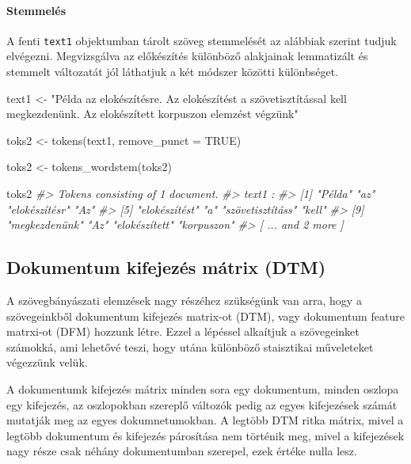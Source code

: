 \documentclass[
]{book}
\newenvironment{Shaded}{\begin{snugshade}}{\end{snugshade}}
\newcommand{\AttributeTok}[1]{\textcolor[rgb]{0.77,0.63,0.00}{#1}}
\newcommand{\CommentTok}[1]{\textcolor[rgb]{0.56,0.35,0.01}{\textit{#1}}}
\newcommand{\ConstantTok}[1]{\textcolor[rgb]{0.00,0.00,0.00}{#1}}
\newcommand{\FunctionTok}[1]{\textcolor[rgb]{0.00,0.00,0.00}{#1}}
\newcommand{\NormalTok}[1]{#1}
\newcommand{\OtherTok}[1]{\textcolor[rgb]{0.56,0.35,0.01}{#1}}
\newcommand{\StringTok}[1]{\textcolor[rgb]{0.31,0.60,0.02}{#1}}
\begin{document}
\hypertarget{stemmeluxe9s}{%
\paragraph{Stemmelés}\label{stemmeluxe9s}}

A fenti \texttt{text1} objektumban tárolt szöveg stemmelését az alábbiak
szerint tudjuk elvégezni. Megvizsgálva az előkészítés különböző
alakjainak lemmatizált és stemmelt változatát jól láthatjuk a két
módszer közötti különbséget.

\begin{Shaded}
\begin{Highlighting}[]

\NormalTok{text1 }\OtherTok{\textless{}{-}} \StringTok{"Példa az elokészítésre. Az elokészítést a szövetisztítással kell megkezdenünk. Az elokészített korpuszon elemzést végzünk"}

\NormalTok{toks2 }\OtherTok{\textless{}{-}} \FunctionTok{tokens}\NormalTok{(text1, }\AttributeTok{remove\_punct =} \ConstantTok{TRUE}\NormalTok{)}

\NormalTok{toks2 }\OtherTok{\textless{}{-}} \FunctionTok{tokens\_wordstem}\NormalTok{(toks2)}

\NormalTok{toks2}
\CommentTok{\#\textgreater{} Tokens consisting of 1 document.}
\CommentTok{\#\textgreater{} text1 :}
\CommentTok{\#\textgreater{}  [1] "Példa"           "az"              "elokészítésr"    "Az"             }
\CommentTok{\#\textgreater{}  [5] "elokészítést"    "a"               "szövetisztításs" "kell"           }
\CommentTok{\#\textgreater{}  [9] "megkezdenünk"    "Az"              "elokészített"    "korpuszon"      }
\CommentTok{\#\textgreater{} [ ... and 2 more ]}
\end{Highlighting}
\end{Shaded}

\hypertarget{dokumentum-kifejezuxe9s-muxe1trix-dtm}{%
\subsection{Dokumentum kifejezés mátrix
(DTM)}\label{dokumentum-kifejezuxe9s-muxe1trix-dtm}}

A szövegbányászati elemzések nagy részéhez szükségünk van arra, hogy a
szövegeinkből dokumentum kifejezés matrix-ot (DTM), vagy dokumentum
feature matrxi-ot (DFM) hozzunk létre. Ezzel a lépéssel alkaítjuk a
szövegeinket számokká, ami lehetővé teszi, hogy utána különböző
staisztikai műveleteket végezzünk velük.

A dokumentumk kifejezés mátrix minden sora egy dokumentum, minden
oszlopa egy kifejezés, az oszlopokban szereplő változók pedig az egyes
kifejezések számát mutatják meg az egyes dokumnetumokban. A legtöbb DTM
ritka mátrix, mivel a legtöbb dokumentum és kifejezés párosítása nem
történik meg, mivel a kifejezések nagy része csak néhány dokumentumban
szerepel, ezek értéke nulla lesz.
\end{document}
